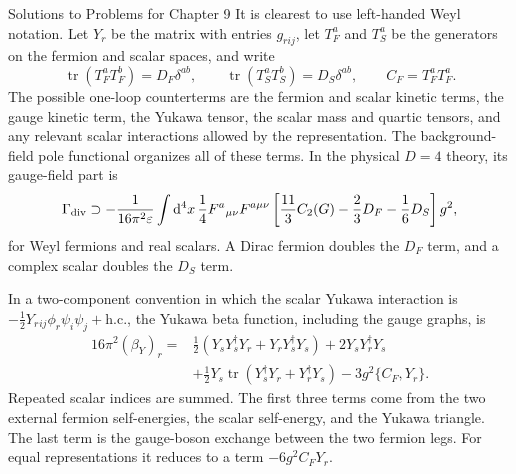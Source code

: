 \begin{bankssolutions}{Solutions to Problems for Chapter 9}
It is clearest to use left-handed Weyl notation.  Let $Y_r$ be the matrix
with entries $g_{rij}$, let $T_F^a$ and $T_S^a$ be the generators on the
fermion and scalar spaces, and write
\[
 \operatorname{tr}(T_F^aT_F^b)=D_F\delta^{ab},
 \qquad
 \operatorname{tr}(T_S^aT_S^b)=D_S\delta^{ab},
 \qquad
 C_F=T_F^aT_F^a .
\]
The possible one-loop counterterms are the fermion and scalar kinetic terms,
the gauge kinetic term, the Yukawa tensor, the scalar mass and quartic
tensors, and any relevant scalar interactions allowed by the representation.
The background-field pole functional organizes all of these terms.  In the
physical $D=4$ theory, its gauge-field part is
\[
 \Gamma_{\rm div}\supset
 -\frac{1}{16\pi^2\varepsilon}\int\mathop{}\!\mathrm{d}^4x\,
 \frac14 F^a{}_{\mu\nu}F^{a\mu\nu}
 \left[\frac{11}{3}C_2(G)-\frac{2}{3}D_F-\frac{1}{6}D_S\right]g^2,
\]
for Weyl fermions and real scalars.  A Dirac fermion doubles the $D_F$
term, and a complex scalar doubles the $D_S$ term.

In a two-component convention in which the scalar Yukawa interaction is
$-\frac12Y_r{}_{ij}\phi_r\psi_i\psi_j+\text{h.c.}$, the Yukawa beta
function, including the gauge graphs, is
\begin{align}
16\pi^2(\beta_Y)_r={}&
 \frac12(Y_sY_s^\dagger Y_r+Y_rY_s^\dagger Y_s)
 +2Y_sY_r^\dagger Y_s\nonumber\\
 &+\frac12Y_s\operatorname{tr}(Y_s^\dagger Y_r+Y_r^\dagger Y_s)
 -3g^2\{C_F,Y_r\}. \label{eq:9.6-sol-yukawa}
\end{align}
Repeated scalar indices are summed.  The first three terms come from the
two external fermion self-energies, the scalar self-energy, and the Yukawa
triangle.  The last term is the gauge-boson exchange between the two fermion
 legs.  For equal representations it reduces to a term
 $-6g^2C_FY_r$.


\end{bankssolutions}
